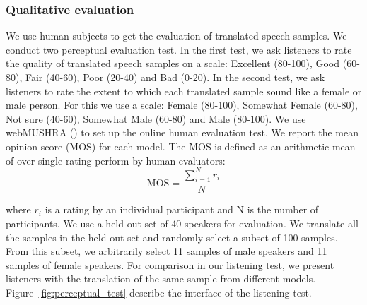 \subsubsection{Qualitative evaluation}
\label{sec:qualt_eval}
We use human subjects to get the evaluation of translated speech samples. We conduct two perceptual evaluation test. In the first test, we ask listeners to rate the quality of translated speech samples on a scale: Excellent (80-100), Good (60-80), Fair (40-60), Poor (20-40) and Bad (0-20). In the second test, we ask listeners to rate the extent to which each translated sample sound like a female or male person. For this we use a scale: Female (80-100), Somewhat Female (60-80), Not sure (40-60), Somewhat Male (60-80) and Male (80-100). We use webMUSHRA (\cite{schoeffler2018webmushra}) to set up the online human evaluation test.  We report the mean opinion score (MOS) for each model. The MOS is defined as an arithmetic mean of over single rating perform by human evaluators:
\begin{equation}
    \text{MOS} = \frac{\sum_{i=1}^N r_i}{N}
\end{equation}

where $r_i$ is a rating by an individual participant and N is the number of participants. We use a held out set of 40 speakers for evaluation. We translate all the samples in the held out set and randomly select a subset of 100 samples. From this subset, we arbitrarily select 11 samples of male speakers and 11 samples of female speakers. For comparison in our listening test, we present listeners with the translation of the same sample from different models. Figure~\ref{fig:perceptual_test} describe the interface of the listening test.

